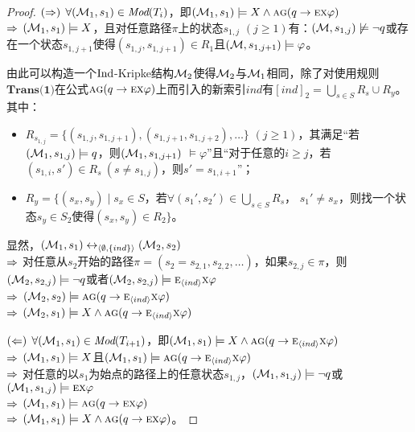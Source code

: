 \begin{proof}
	$(\Rightarrow)$ $\forall ({\cal M}_1,s_1)\in \textit{Mod}(T_i)$，即$({\cal M}_1, s_1) \models X \wedge \textsc{a}\textsc{g}(q \rightarrow \textsc{e} \textsc{x} \varphi)$\\
	$\Rightarrow$ $({\cal M}_1,s_1) \models X$，且对任意路径$\pi$上的状态$s_{1,j}$ $(j\geq 1)$有：$({\cal M},s_{1,j}) \not \models \neg q$或存在一个状态$s_{1,j+1}$使得$(s_{1,j},s_{1,j+1})
	\in R_1$且$({\cal M},s_{1,j+1}) \models \varphi$。
	
	由此可以构造一个$\textrm{Ind}$-Kripke结构${\cal M}_2$使得${\cal M}_2$与${\cal M}_1$相同，除了对使用规则$\textbf{Trans(1)}$在公式$\textsc{a}\textsc{g}(q \rightarrow \textsc{e} \textsc{x} \varphi)$上而引入的新索引$ind$有$[ind]_2=\bigcup_{s\in S} R_s \cup R_y$。其中：
	\begin{itemize}
		\item $R_{s_{1,j}}=\{(s_{1,j}, s_{1,j+1}), (s_{1,j+1}, s_{1,j+2}),\dots\}$ $(j\geq 1)$，其满足“若$({\cal M}_1,s_{1,j}) \models q$，则$({\cal M}_1,s_{1,j+1})$ $\models \varphi$”且“对于任意的$i\geq j$，若$(s_{1,i}, s') \in R_s\ (s \not= s_{1,j})$，则$s'=s_{1,i+1}$”；
		\item $R_y=\{(s_x,s_y)\mid s_x\in S$，若$\forall(s_1',s_2') \in \bigcup_{s\in S} R_s$， $s_1'\not= s_x$，则找一个状态$s_y\in S_2$使得$(s_x,s_y)\in R_2\}$。
	\end{itemize}
	
	显然，$({\cal M}_1,s_1) \leftrightarrow_{{\langle{\emptyset,\{ind\}}\rangle}} ({\cal M}_2,s_2)$\\
	$\Rightarrow$ 对任意从$s_2$开始的路径$\pi=( s_2= s_{2,1} , s_{2,2}, \dots)$，如果$s_{2,j} \in \pi$，则$({\cal M}_2,s_{2,j}) \models \neg q$或者$({\cal M}_2,s_{2,j}) \models \textsc{e}_{{\langle{ind}\rangle}} \textsc{x} \varphi$\\
	$\Rightarrow$ $({\cal M}_2,s_2)\models \textsc{a}\textsc{g}(q \rightarrow \textsc{e}_{{\langle{ind}\rangle}} \textsc{x} \varphi)$\\
	$\Rightarrow$ $({\cal M}_2,s_1) \models X \wedge \textsc{a}\textsc{g}(q \rightarrow \textsc{e}_{{\langle{ind}\rangle}} \textsc{x} \varphi)$
	
	$(\Leftarrow)$ $\forall ({\cal M}_1,s_1) \in \textit{Mod}(T_{i+1})$，即$({\cal M}_1,s_1) \models X \wedge \textsc{a} \textsc{g}(q \rightarrow \textsc{e}_{{\langle{ind}\rangle}} \textsc{x} \varphi )$\\
	$\Rightarrow$ $({\cal M}_1,s_1) \models X$且$({\cal M}_1,s_1) \models \textsc{a} \textsc{g}(q \rightarrow \textsc{e}_{{\langle{ind}\rangle}} \textsc{x} \varphi)$\\
	$\Rightarrow$ 对任意的以$s_1$为始点的路径上的任意状态$s_{1,j}$，$({\cal M}_1,s_{1,j}) \models \neg q$或$({\cal M}_1,s_{1,j}) \models \textsc{e}\textsc{x}\varphi$\\
	$\Rightarrow$ $({\cal M}_1,s_1) \models \textsc{a}\textsc{g}(q \rightarrow \textsc{e} \textsc{x} \varphi)$\\
	$\Rightarrow$ $({\cal M}_1,s_1) \models X \wedge \textsc{a}\textsc{g}(q \rightarrow \textsc{e} \textsc{x} \varphi)$。
	

\end{proof}
